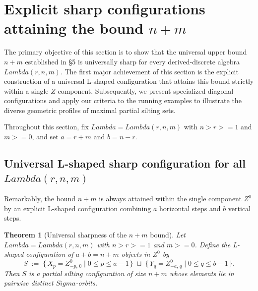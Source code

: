 \documentclass[11pt, a4paper]{article}
\newtheorem{theorem}{Theorem}[section]
\theoremstyle{definition}
\def\Lambda{Lambda}%
\def\Sigma{Sigma}%
\def\ge{>=}%
\def\mathcal#1{#1}%
\begin{document}
\section{Explicit sharp configurations attaining the bound \texorpdfstring{$n+m$}{n+m}}\label{sec:sharp}

The primary objective of this section is to show that the universal upper bound $n+m$ established in \S 5 is universally sharp for every derived-discrete algebra $\Lambda(r,n,m)$. The first major achievement of this section is the explicit construction of a universal L-shaped configuration that attains this bound strictly within a single $\mathcal Z$-component. Subsequently, we present specialized diagonal configurations and apply our criteria to the running examples to illustrate the diverse geometric profiles of maximal partial silting sets.

Throughout this section, fix $\Lambda = \Lambda(r,n,m)$ with $n > r \ge 1$ and $m \ge 0$, and set $a = r+m$ and $b = n-r$.

\subsection{Universal L-shaped sharp configuration for all \texorpdfstring{$\Lambda(r,n,m)$}{Lambda(r,n,m)}}\label{sec:sharp-general}

Remarkably, the bound $n+m$ is always attained within the single component $\mathcal Z^0$ by an explicit L-shaped configuration combining $a$ horizontal steps and $b$ vertical steps.

\begin{theorem}[Universal sharpness of the $n+m$ bound]\label{thm:sharp-universal}
Let $\Lambda = \Lambda(r,n,m)$ with $n > r \ge 1$ and $m \ge 0$. Define the L-shaped configuration of $a + b = n + m$ objects in $\mathcal Z^0$ by
\[
  S \;:=\; \bigl\{\, X_p = Z_{-p,\,0}^0 \;\big|\; 0 \le p \le a-1 \,\bigr\}
  \;\sqcup\;
  \bigl\{\, Y_q = Z_{-a,\,q}^0 \;\big|\; 0 \le q \le b-1 \,\bigr\}.
\]
Then $S$ is a partial silting configuration of size $n + m$ whose elements lie in pairwise distinct $\Sigma$-orbits.
\end{theorem}
\end{document}

